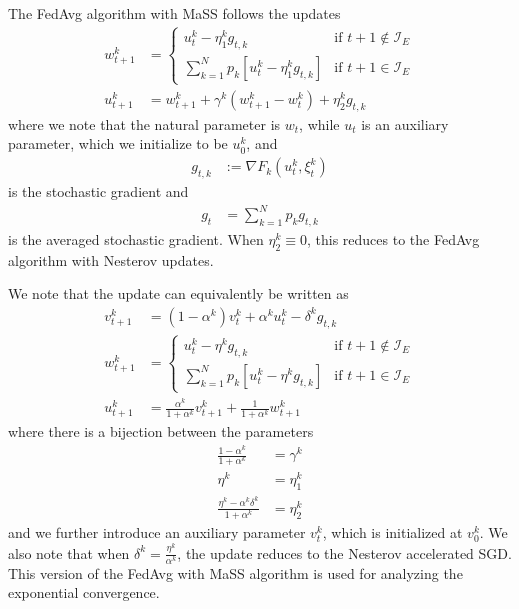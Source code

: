The FedAvg algorithm with MaSS follows the updates
\begin{align*}
w_{t+1}^{k} & =\begin{cases}
u_{t}^{k}-\eta_{1}^{k}g_{t,k} & \text{if }t+1\notin\mathcal{I}_{E}\\
\sum_{k=1}^{N}p_{k}\left[u_{t}^{k}-\eta_{1}^{k}g_{t,k}\right] & \text{if }t+1\in\mathcal{I}_{E}
\end{cases}\\
u_{t+1}^{k} & =w_{t+1}^{k}+\gamma^{k}(w_{t+1}^{k}-w_{t}^{k})+\eta_{2}^{k}g_{t,k}
\end{align*}
where we note that the natural parameter is $w_{t}$, while $u_{t}$
is an auxiliary parameter, which we initialize to be $u_{0}^{k}$,
and 
\begin{align*}
g_{t,k} & :=\nabla F_{k}(u_{t}^{k},\xi_{t}^{k})
\end{align*}
is the stochastic gradient and 
\begin{align*}
g_{t} & =\sum_{k=1}^{N}p_{k}g_{t,k}
\end{align*}
is the averaged stochastic gradient. When $\eta_{2}^{k}\equiv0$,
this reduces to the FedAvg algorithm with Nesterov updates.

We note that the update can equivalently be written as 
\begin{align*}
v_{t+1}^{k} & =(1-\alpha^{k})v_{t}^{k}+\alpha^{k}u_{t}^{k}-\delta^{k}g_{t,k}\\
w_{t+1}^{k} & =\begin{cases}
u_{t}^{k}-\eta^{k}g_{t,k} & \text{if }t+1\notin\mathcal{I}_{E}\\
\sum_{k=1}^{N}p_{k}\left[u_{t}^{k}-\eta^{k}g_{t,k}\right] & \text{if }t+1\in\mathcal{I}_{E}
\end{cases}\\
u_{t+1}^{k} & =\frac{\alpha^{k}}{1+\alpha^{k}}v_{t+1}^{k}+\frac{1}{1+\alpha^{k}}w_{t+1}^{k}
\end{align*}
where there is a bijection between the parameters 
\begin{align*}
\frac{1-\alpha^{k}}{1+\alpha^{k}} & =\gamma^{k}\\
\eta^{k} & =\eta_{1}^{k}\\
\frac{\eta^{k}-\alpha^{k}\delta^{k}}{1+\alpha^{k}} & =\eta_{2}^{k}
\end{align*}
and we further introduce an auxiliary parameter $v_{t}^{k}$, which
is initialized at $v_{0}^{k}$. We also note that when $\delta^{k}=\frac{\eta^{k}}{\alpha^{k}}$,
the update reduces to the Nesterov accelerated SGD. This version of
the FedAvg with MaSS algorithm is used for analyzing the exponential
convergence. 

